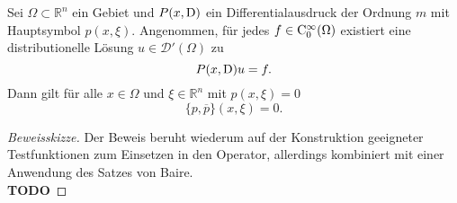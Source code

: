 \begin{thm}\label{thm:3.1_hoer}
Sei $\Omega\subset\mathbb{R}^n$ ein Gebiet und $P(x,\mathrm D)$ ein Differentialausdruck der Ordnung $m$ mit Hauptsymbol $p(x,\xi)$.
Angenommen, für jedes $f\in \mathrm C_0^\infty(\Omega)$  existiert eine distributionelle Lösung $u\in\mathscr D'(\Omega)$ zu
\begin{equation}\label{eq:3.1_hoer}
P(x,\mathrm D)u=f.
\end{equation}
Dann gilt für alle $x\in\Omega$ und $\xi\in\mathbb{R}^n$ mit $p(x,\xi)=0$
\begin{equation}\label{eq:3.1_hoer_aussage}
 \{p,\overline{p}\}(x,\xi)=0.
\end{equation}
\end{thm}
\begin{proof}[Beweisskizze] 
Der Beweis beruht wiederum auf der Konstruktion geeigneter Testfunktionen zum Einsetzen in den Operator, allerdings kombiniert mit einer Anwendung des Satzes von Baire.\\
{\bf TODO}
\end{proof}

